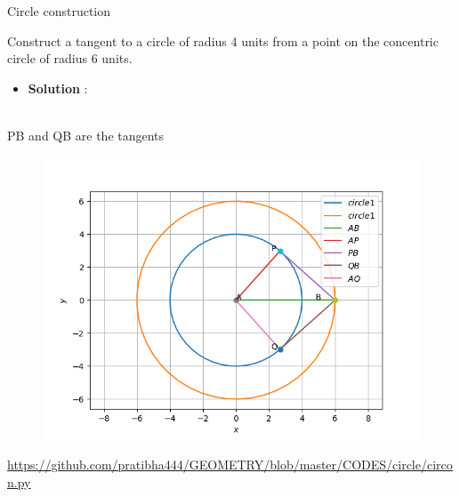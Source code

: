\begin{frame}{Circle construction}

 Construct a tangent to a circle of radius 4 units
from a point on the concentric circle of radius
6 units.\\
\begin{itemize}
\item\textbf{Solution} :\\

\end{itemize}
\\  PB and QB are the tangents

\seti
\end{frame}
\begin{frame}
\begin{figure}
\includegraphics[scale=.4]{./CODES/circle/circon.png}
\end{figure}
\url{https://github.com/pratibha444/GEOMETRY/blob/master/CODES/circle/circon.py}  
\end{frame}